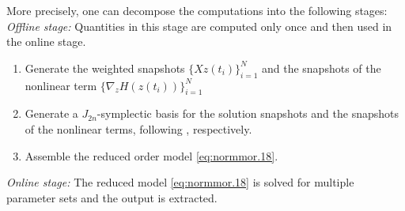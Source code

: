 More precisely, one can decompose the computations into the following stages:
\emph{Offline stage:} Quantities in this stage are computed only once and then used in the online stage.
\begin{enumerate}
\item Generate the weighted snapshots $\{ X z(t_i) \}_{i=1}^N$ and the snapshots of the nonlinear term $\{\nabla_zH(z(t_i))\}_{i=1}^N$
\item Generate a $J_{2n}$-symplectic basis for the solution snapshots and the snapshots of the nonlinear terms, following , respectively.
\item Assemble the reduced order model \cref{eq:normmor.18}.
\end{enumerate}
\emph{Online stage:} The reduced model \cref{eq:normmor.18} is solved for multiple parameter sets and the output is extracted.
